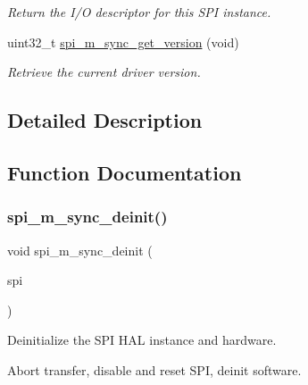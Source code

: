 \begin{DoxyCompactItemize}
$$\begin{DoxyCompactList}\small\item\em Return the I/O descriptor for this S\+PI instance. \end{DoxyCompactList}\item 
uint32\+\_\+t \hyperlink{group__doc__driver__hal__spi__master__sync_gad547327b1fc9255bdde6946aa7e419e7}{spi\+\_\+m\+\_\+sync\+\_\+get\+\_\+version} (void)
\begin{DoxyCompactList}\small\item\em Retrieve the current driver version. \end{DoxyCompactList}\end{DoxyCompactItemize}


\subsection{Detailed Description}


\subsection{Function Documentation}
\mbox{\label{group__doc__driver__hal__spi__master__sync_ga9cf25d877d82e3e1f572643d579af447}} 
\subsubsection{\texorpdfstring{spi\+\_\+m\+\_\+sync\+\_\+deinit()}{spi\_m\_sync\_deinit()}}
{\footnotesize\ttfamily void spi\+\_\+m\+\_\+sync\+\_\+deinit (\begin{DoxyParamCaption}\item[{struct \hyperlink{structspi__m__sync__descriptor}{spi\+\_\+m\+\_\+sync\+\_\+descriptor} $\ast$}]{spi }\end{DoxyParamCaption})}



Deinitialize the S\+PI H\+AL instance and hardware. 

Abort transfer, disable and reset S\+PI, deinit software.


